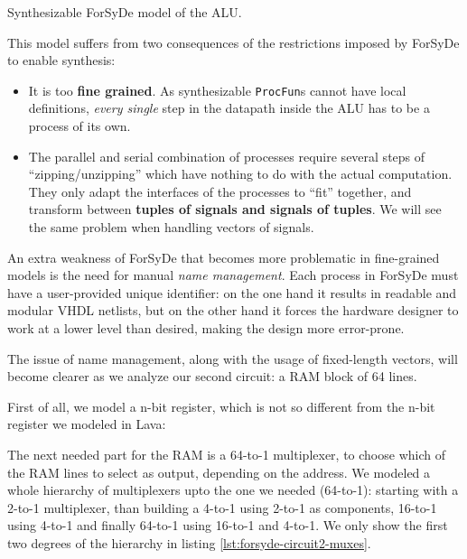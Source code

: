             \begin{listing}[h!]
                \caption{Synthesizable ForSyDe model of the ALU.
                    \label{lst:forsyde-circuit1-model-alusyn}}
            \end{listing}

            This model suffers from two consequences of the restrictions imposed by ForSyDe to
            enable synthesis:

            \begin{itemize}
                \item It is too \textbf{fine grained}. As synthesizable \texttt{ProcFun}s cannot
                    have local definitions, \emph{every single} step in the datapath inside the
                    ALU has to be a process of its own.

                \item The parallel and serial combination of processes require several steps of
                    ``zipping/unzipping'' which have nothing to do with the actual computation.
                    They only adapt the interfaces of the processes to ``fit'' together, and
                    transform between \textbf{tuples of signals and signals of tuples}. We will
                    see the same problem when handling vectors of signals.
            \end{itemize}

            An extra weakness of ForSyDe that becomes more problematic in fine-grained models is the
            need for manual \emph{name management}. Each process in ForSyDe must have a
            user-provided unique identifier: on the one hand it results in readable and modular VHDL
            netlists, but on the other hand it forces the hardware designer to work at a lower level
            than desired, making the design more error-prone.

            The issue of name management, along with the usage of fixed-length vectors, will become
            clearer as we analyze our second circuit: a RAM block of 64 lines.

            First of all, we model a n-bit register, which is not so different from the n-bit
            register we modeled in Lava:


            The next needed part for the RAM is a 64-to-1 multiplexer, to choose which of the RAM
            lines to select as output, depending on the address. We modeled a whole hierarchy of
            multiplexers upto the one we needed (64-to-1): starting with a 2-to-1 multiplexer, than
            building a 4-to-1 using 2-to-1 as components, 16-to-1 using 4-to-1 and finally 64-to-1
            using 16-to-1 and 4-to-1. We only show the first two degrees of the hierarchy in listing
            \ref{lst:forsyde-circuit2-muxes}.

